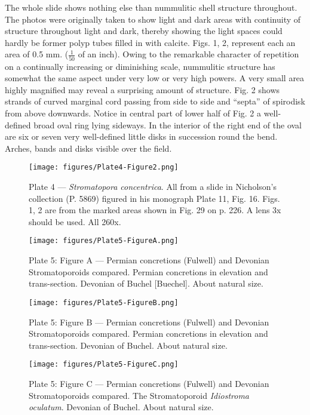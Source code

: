 \documentclass[a4paper, 12pt, oneside]{article}
\begin{document}
The whole slide shows nothing else than nummulitic shell structure throughout. The photos were originally taken to show light and dark areas with continuity of structure throughout light and dark, thereby showing the light spaces could hardly be former polyp tubes filled in with calcite. Figs. 1, 2, represent each an area of 0.5 mm. ($\frac{1}{50}$ of an inch). Owing to the remarkable character of repetition on a continually increasing or diminishing scale, nummulitic structure has somewhat the same aspect under very low or very high powers. A very small area highly magnified may reveal a surprising amount of structure. Fig. 2 shows strands of curved marginal cord passing from side to side and ``septa'' of spirodisk from above downwards. Notice in central part of lower half of Fig. 2 a well-defined broad oval ring lying sideways. In the interior of the right end of the oval are six or seven very well-defined little disks in succession round the bend. Arches, bands and disks visible over the field.
\clearpage
\begin{figure}[b]
\centering
\texttt{[image: figures/Plate4-Figure2.png]}
\caption{\small Plate 4 --- \emph{Stromatopora concentrica}. All from a slide in Nicholson's collection (P. 5869) figured in his monograph Plate 11, Fig. 16. Figs. 1, 2 are from the marked areas shown in Fig. 29 on p. 226. A lens 3x should be used. All 260x.}
\end{figure}
\clearpage
{}
\cfoot{\thepage}
\begin{figure}[b]
\centering
\texttt{[image: figures/Plate5-FigureA.png]}
\caption{\small Plate 5: Figure A --- Permian concretions (Fulwell) and Devonian Stromatoporoids compared. Permian concretions in elevation and trans-section. Devonian of Buchel [Buechel]. About natural size.}
\end{figure}
\clearpage
\begin{figure}[b]
\centering
\texttt{[image: figures/Plate5-FigureB.png]}
\caption{\small Plate 5: Figure B --- Permian concretions (Fulwell) and Devonian Stromatoporoids compared. Permian concretions in elevation and trans-section. Devonian of Buchel. About natural size.}
\end{figure}
\clearpage
\begin{figure}[b]
\centering
\texttt{[image: figures/Plate5-FigureC.png]}
\caption{\small Plate 5: Figure C --- Permian concretions (Fulwell) and Devonian Stromatoporoids compared. The Stromatoporoid \emph{Idiostroma oculatum}. Devonian of Buchel. About natural size.}
\end{figure}
\end{document}
